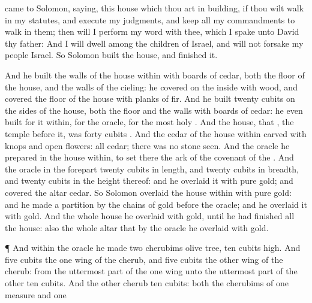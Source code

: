 {{} came to
Solomon,
saying,
 this
house which thou art in
building, if thou wilt
walk in my
statutes, and
execute my
judgments, and
keep all my
commandments to
walk in them; then will I
perform my
word with thee, which I
spake unto
David thy
father:
And I will
dwell
among the
children of
Israel, and will not
forsake my
people
Israel.
So
Solomon
built the
house, and
finished it.
\par }{\PP {}And he
built the
walls of the
house
within with
boards of
cedar, both the
floor of the
house, and the
walls of the
cieling:
{} he
covered
{} on the
inside with
wood, and
covered the
floor of the
house with
planks of
fir.
And he
built
twenty
cubits on the
sides of the
house,
both the
floor and the
walls with
boards of
cedar: he even
built
{} for it
within,
{} for the
oracle,
{} for the
most
holy
{}.
And the
house, that
{}, the
temple
before it, was
forty
cubits
{}.
And the
cedar of the
house
within
{}
carved with
knops and
open
flowers: all
{}
cedar; there was no
stone
seen.
And the
oracle he
prepared
in the
house
within, to
set there the
ark of the
covenant of the
{}.
And the
oracle in the
forepart
{}
twenty
cubits in
length, and
twenty
cubits in
breadth, and
twenty
cubits in the
height thereof: and he
overlaid it with
pure
gold; and
{}
covered the
altar
{}
cedar.
So
Solomon
overlaid the
house
within with
pure
gold: and he made a
partition by the
chains of
gold
before the
oracle; and he
overlaid it with
gold.
And the whole
house he
overlaid with
gold, until he had
finished all the
house: also the whole
altar that
{} by the
oracle he
overlaid with
gold.
\par }{\PP {}¶ And within the
oracle he
made
two
cherubims
{}
olive
tree,
{}
ten
cubits
high.
And
five
cubits
{} the
one
wing of the
cherub, and
five
cubits the
other
wing of the
cherub: from the uttermost
part of the one
wing unto the uttermost
part of the
other
{}
ten
cubits.
And the
other
cherub
{}
ten
cubits:
both the
cherubims
{} of
one
measure and
one
}
